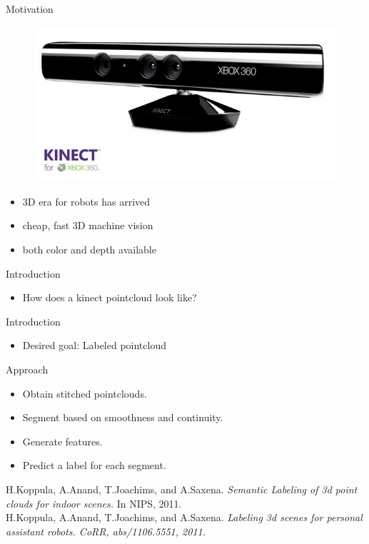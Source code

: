 \documentclass{beamer}
\begin{document}
\begin{frame}{Motivation}
	\begin{figure}[t!]
		\includegraphics[width=.5\linewidth]{kinect.jpg}
	\end{figure}

	\begin{itemize}
		\item 3D era for robots has arrived 
		\item  cheap, fast 3D machine vision
		\item  both color and depth available
	\end{itemize}

\end{frame}

\begin{frame}{Introduction}
	\begin{itemize}
		\item How does a kinect pointcloud look like?

	\end{itemize}
\end{frame}

\begin{frame}{Introduction}
	\begin{itemize}
		\item Desired goal: Labeled pointcloud

	\end{itemize}
\end{frame}

\begin{frame}{Approach}
	\begin{itemize}
		\item Obtain stitched pointclouds.
		\item Segment based on smoothness and continuity. 
		\item Generate features.
		\item Predict a label for each segment.
	\end{itemize}
	
	\vskip 0.5in
{\scriptsize 

 H.Koppula, A.Anand, T.Joachims, and A.Saxena. \emph{Semantic Labeling of 3d point clouds for indoor scenes.} In NIPS, 2011.\\
 H.Koppula, A.Anand, T.Joachims, and A.Saxena. \emph{Labeling 3d scenes for personal assistant robots. CoRR, abs/1106.5551, 2011.}
}
\end{frame}
\end{document}
